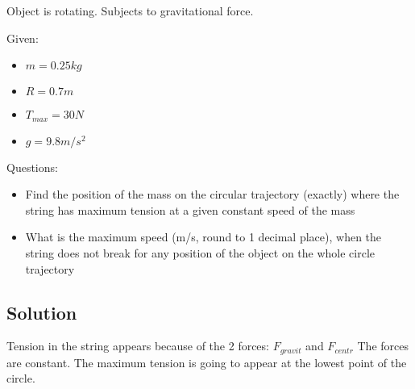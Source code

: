 
Object is rotating. Subjects to gravitational force.


\bigbreak Given: 
\begin{itemize}
    \item $  m  = 0.25kg $
    \item $ R = 0.7m $
    \item $ T_{max} = 30N $
    \item $ g = 9.8m/s^2 $
\end{itemize}


\bigbreak Questions:
\begin{itemize}
    \item Find the position of the mass on the circular trajectory (exactly) where the string has
    maximum tension at a given constant speed of the mass
    \item What is the maximum speed (m/s, round to 1 decimal place), when the string does not
    break for any position of the object on the whole circle trajectory
\end{itemize}

\subsection*{Solution}
Tension in the string appears because of the 2 forces: $F_{gravit}$ and $F_{centr}$
The forces are constant. The maximum tension is going to appear at the lowest point of the circle.

